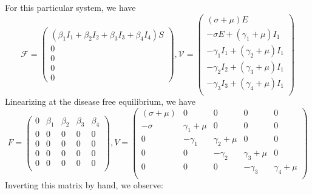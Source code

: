 \documentclass{article}
\begin{document}
For this particular system, we have
$$
\mathcal{F} = \begin{pmatrix}
(\beta_1 I_1 + \beta_2 I_2 + \beta_3 I_3 + \beta_4 I_4) S\\
0\\
0\\
0\\
0
\end{pmatrix}, \mathcal{V} = \begin{pmatrix}
(\sigma + \mu) E \\
- \sigma E + (\gamma_1 + \mu) I_1\\
- \gamma_1 I_1 + (\gamma_2 + \mu) I_1\\
- \gamma_2 I_2 + (\gamma_3 + \mu) I_1\\
- \gamma_3 I_3 + (\gamma_4 + \mu) I_1\\
\end{pmatrix}
$$
Linearizing at the disease free equilibrium, we have
$$
F = \begin{pmatrix}
0 & \beta_1 & \beta_2 & \beta_3 & \beta_4\\
0 & 0 & 0 & 0 & 0\\
0 & 0 & 0 & 0 & 0\\
0 & 0 & 0 & 0 & 0\\
0 & 0 & 0 & 0 & 0\\
\end{pmatrix},
V = \begin{pmatrix}
(\sigma + \mu) & 0 & 0 & 0 & 0\\
- \sigma & \gamma_1 + \mu & 0 & 0 & 0\\
0 & - \gamma_1 & \gamma_2 + \mu & 0 & 0\\
0 & 0 & - \gamma_2 & \gamma_3 + \mu & 0\\
0 & 0 & 0 & - \gamma_3 & \gamma_4 + \mu\\
\end{pmatrix}
$$
Inverting this matrix by hand, we observe:
\end{document}

